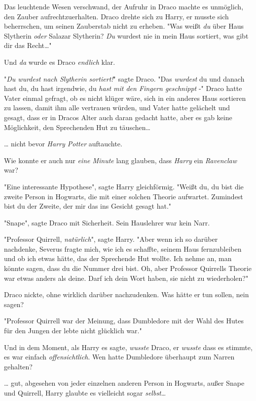 {Das leuchtende Wesen verschwand, der Aufruhr in Draco machte es unmöglich, den Zauber aufrechtzuerhalten. Draco drehte sich zu Harry, er musste sich beherrschen, um seinen Zauberstab nicht zu erheben. "Was weißt \emph{du} über Haus Slytherin \emph{oder} Salazar Slytherin? \emph{Du} wurdest nie in mein Haus sortiert, was gibt dir das Recht…"

Und \emph{da} wurde es Draco \emph{endlich} klar.

"\emph{Du wurdest nach Slytherin sortiert!}" sagte Draco. "Das \emph{wurdest} du und danach hast du, du hast irgendwie, du \emph{hast mit den Fingern geschnippt} -" Draco hatte Vater einmal gefragt, ob es nicht klüger wäre, sich in ein anderes Haus sortieren zu lassen, damit ihm alle vertrauen würden, und Vater hatte gelächelt und gesagt, dass er in Dracos Alter auch daran gedacht hatte, aber es gab keine Möglichkeit, den Sprechenden Hut zu täuschen…

… nicht bevor \emph{Harry Potter} auftauchte.

Wie konnte er auch nur \emph{eine Minute} lang glauben, dass \emph{Harry} ein \emph{Ravenclaw} war?

"Eine interessante Hypothese", sagte Harry gleichförmig. "Weißt du, du bist die zweite Person in Hogwarts, die mit einer solchen Theorie aufwartet. Zumindest bist du der Zweite, der mir das ins Gesicht gesagt hat."

"Snape", sagte Draco mit Sicherheit. Sein Hauslehrer war kein Narr.

"Professor Quirrell, \emph{natürlich}", sagte Harry. "Aber wenn ich so darüber nachdenke, Severus fragte mich, wie ich es schaffte, seinem Haus fernzubleiben und ob ich etwas hätte, das der Sprechende Hut wollte. Ich nehme an, man könnte sagen, dass du die Nummer drei bist. Oh, aber Professor Quirrells Theorie war etwas anders als deine. Darf ich dein Wort haben, sie nicht zu wiederholen?"

Draco nickte, ohne wirklich darüber nachzudenken. Was hätte er tun sollen, nein sagen?

"Professor Quirrell war der Meinung, dass Dumbledore mit der Wahl des Hutes für den Jungen der lebte nicht glücklich war."

Und in dem Moment, als Harry es sagte, \emph{wusste} Draco, er \emph{wusste} dass es stimmte, es war einfach \emph{offensichtlich}. Wen hatte Dumbledore überhaupt zum Narren gehalten?

… gut, abgesehen von jeder einzelnen anderen Person in Hogwarts, außer Snape und Quirrell, Harry glaubte es vielleicht sogar \emph{selbst}…

}
